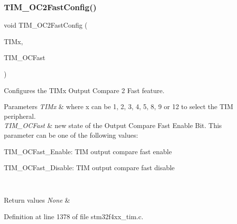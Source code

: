 \mbox{\label{group___t_i_m_ga413359c87f46c69f1ffe2dc8fb3a65e7}} 
\subsubsection{\texorpdfstring{T\+I\+M\+\_\+\+O\+C2\+Fast\+Config()}{TIM\_OC2FastConfig()}}
{\footnotesize\ttfamily void T\+I\+M\+\_\+\+O\+C2\+Fast\+Config (\begin{DoxyParamCaption}\item[{\hyperlink{struct_t_i_m___type_def}{T\+I\+M\+\_\+\+Type\+Def} $\ast$}]{T\+I\+Mx,  }\item[{uint16\+\_\+t}]{T\+I\+M\+\_\+\+O\+C\+Fast }\end{DoxyParamCaption})}



Configures the T\+I\+Mx Output Compare 2 Fast feature. 


\begin{DoxyParams}{Parameters}
{\em T\+I\+Mx} & where x can be 1, 2, 3, 4, 5, 8, 9 or 12 to select the T\+IM peripheral. \\
\hline
{\em T\+I\+M\+\_\+\+O\+C\+Fast} & new state of the Output Compare Fast Enable Bit. This parameter can be one of the following values\+: \begin{DoxyItemize}
\item T\+I\+M\+\_\+\+O\+C\+Fast\+\_\+\+Enable\+: T\+IM output compare fast enable \item T\+I\+M\+\_\+\+O\+C\+Fast\+\_\+\+Disable\+: T\+IM output compare fast disable \end{DoxyItemize}
\\
\hline
\end{DoxyParams}

\begin{DoxyRetVals}{Return values}
{\em None} & \\
\hline
\end{DoxyRetVals}


Definition at line 1378 of file stm32f4xx\+\_\+tim.\+c.

\mbox{\label{group___t_i_m_ga2017455121d910d6ff63ac6f219842c5}} 
